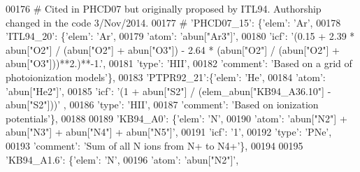 \begin{DoxyCode}
00176 \textcolor{comment}{# Cited in PHCD07 but originally proposed by ITL94. Authorship changed in the code 3/Nov/2014. }
00177 \textcolor{comment}{#                         'PHCD07\_15': \{'elem': 'Ar',}
00178                          \textcolor{stringliteral}{'ITL94\_20'}: \{\textcolor{stringliteral}{'elem'}: \textcolor{stringliteral}{'Ar'},
00179                                        \textcolor{stringliteral}{'atom'}: \textcolor{stringliteral}{'abun["Ar3"]'},
00180                                        \textcolor{stringliteral}{'icf'}: \textcolor{stringliteral}{'(0.15 + 2.39 * abun["O2"] / (abun["O2"] + abun["O3"]) - 2.64
       * (abun["O2"] / (abun["O2"] + abun["O3"]))**2.)**-1.'},
00181                                        \textcolor{stringliteral}{'type'}: \textcolor{stringliteral}{'HII'},   
00182                                        \textcolor{stringliteral}{'comment'}: \textcolor{stringliteral}{'Based on a grid of photoionization models'}\},
00183                          \textcolor{stringliteral}{'PTPR92\_21'}:\{\textcolor{stringliteral}{'elem'}: \textcolor{stringliteral}{'He'},
00184                                        \textcolor{stringliteral}{'atom'}: \textcolor{stringliteral}{'abun["He2"]'},
00185                                        \textcolor{stringliteral}{'icf'}: \textcolor{stringliteral}{'(1 + abun["S2"] / (elem\_abun["KB94\_A36.10"] -  abun["S2"]))'}
      ,
00186                                        \textcolor{stringliteral}{'type'}: \textcolor{stringliteral}{'HII'},
00187                                        \textcolor{stringliteral}{'comment'}: \textcolor{stringliteral}{'Based on ionization potentials'}\},
00188                          
00189                          \textcolor{stringliteral}{'KB94\_A0'}: \{\textcolor{stringliteral}{'elem'}: \textcolor{stringliteral}{'N'},
00190                                     \textcolor{stringliteral}{'atom'}: \textcolor{stringliteral}{'abun["N2"] + abun["N3"] + abun["N4"] + abun["N5"]'},
00191                                     \textcolor{stringliteral}{'icf'}: \textcolor{stringliteral}{'1'},
00192                                      \textcolor{stringliteral}{'type'}: \textcolor{stringliteral}{'PNe'},
00193                                      \textcolor{stringliteral}{'comment'}: \textcolor{stringliteral}{'Sum of all N ions from N+ to N4+'}\},
00194                          
00195                          \textcolor{stringliteral}{'KB94\_A1.6'}: \{\textcolor{stringliteral}{'elem'}: \textcolor{stringliteral}{'N'},
00196                                      \textcolor{stringliteral}{'atom'}: \textcolor{stringliteral}{'abun["N2"]'},

\end{DoxyCode}
